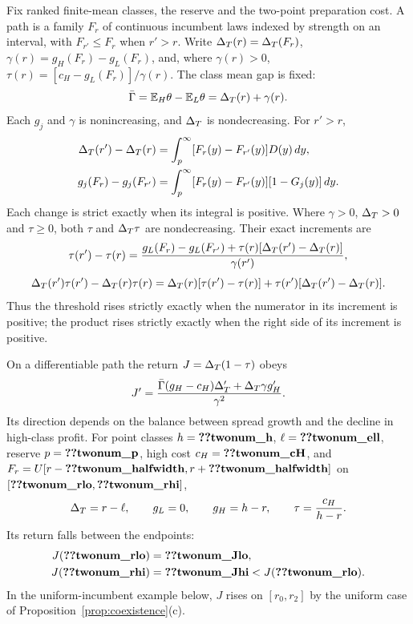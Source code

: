 \begin{lemma}\label{lem:twonumbers}
Fix ranked finite-mean classes, the reserve and the two-point preparation cost. A path is a family \(F_r\) of
continuous incumbent laws indexed by strength on an interval, with \(F_{r'}\le F_r\) when \(r'>r\). Write
\(\Delta_T(r)=\Delta_T(F_r)\), \(\gamma(r)=g_H(F_r)-g_L(F_r)\), and, where \(\gamma(r)>0\),
\(\tau(r)=[c_H-g_L(F_r)]/\gamma(r)\). The class mean gap is fixed:
\[
\bar\Gamma=\mathbb{E}_H\theta-\mathbb{E}_L\theta=\Delta_T(r)+\gamma(r).
\]
Each \(g_j\) and \(\gamma\) is nonincreasing, and \(\Delta_T\) is nondecreasing. For \(r'>r\),
\[
\begin{aligned}
\Delta_T(r')-\Delta_T(r)&=\int_p^\infty[F_r(y)-F_{r'}(y)]D(y)\,dy,\\
g_j(F_r)-g_j(F_{r'})&=\int_p^\infty[F_r(y)-F_{r'}(y)][1-G_j(y)]\,dy.
\end{aligned}
\]
Each change is strict exactly when its integral is positive. Where \(\gamma>0\), \(\Delta_T>0\) and \(\tau\ge0\), both
\(\tau\) and \(\Delta_T\tau\) are nondecreasing. Their exact increments are
\[
\tau(r')-\tau(r)=
\frac{g_L(F_r)-g_L(F_{r'})+\tau(r)[\Delta_T(r')-\Delta_T(r)]}{\gamma(r')},
\]
\[
\Delta_T(r')\tau(r')-\Delta_T(r)\tau(r)
=\Delta_T(r)[\tau(r')-\tau(r)]+\tau(r')[\Delta_T(r')-\Delta_T(r)].
\]
Thus the threshold rises strictly exactly when the numerator in its increment is positive; the product rises
strictly exactly when the right side of its increment is positive.

On a differentiable path the return \(J=\Delta_T(1-\tau)\) obeys
\[
J'=\frac{\bar\Gamma(g_H-c_H)\Delta_T'+\Delta_T\gamma g_H'}{\gamma^2}.
\]
Its direction depends on the balance between spread growth and the decline in high-class profit. For point
classes \(h=\reg{twonum_h}\), \(\ell=\reg{twonum_ell}\), reserve \(p=\reg{twonum_p}\), high cost
\(c_H=\reg{twonum_cH}\), and \(F_r=U[r-\reg{twonum_halfwidth},r+\reg{twonum_halfwidth}]\) on
\([\reg{twonum_rlo},\reg{twonum_rhi}]\),
\[
\Delta_T=r-\ell,\qquad g_L=0,\qquad g_H=h-r,\qquad \tau=\frac{c_H}{h-r}.
\]
Its return falls between the endpoints:
\[
\begin{aligned}
J(\reg{twonum_rlo})&=\reg{twonum_Jlo},\\
J(\reg{twonum_rhi})&=\reg{twonum_Jhi}<J(\reg{twonum_rlo}).
\end{aligned}
\]
In the uniform-incumbent example below, \(J\) rises on \([r_0,r_2]\) by the uniform case of
Proposition~\ref{prop:coexistence}(c).
\end{lemma}

